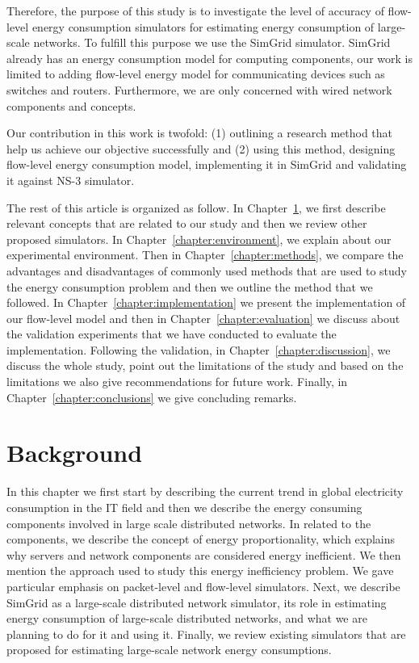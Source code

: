 Therefore, the purpose of this study is to investigate the level of accuracy of flow-level energy consumption simulators for estimating energy consumption of large-scale networks. To fulfill this purpose we use the SimGrid simulator. SimGrid already has an energy consumption model for computing components, our work is limited to adding flow-level energy model for communicating devices such as switches and routers. Furthermore, we are only concerned with wired network components and concepts. 

Our contribution in this work is twofold: (1) outlining a research method that help us achieve our objective successfully and (2) using this method, designing flow-level energy consumption model, implementing it in SimGrid and validating it against NS-3 simulator. 

The rest of this article is organized as follow. In Chapter~\ref{chapter:background}, we first describe relevant concepts that are related to our study and then we review other proposed simulators. In Chapter~\ref{chapter:environment}, we explain about our experimental environment. Then in Chapter~\ref{chapter:methods}, we compare the advantages and disadvantages of commonly used methods that are used to study the energy consumption problem and then we outline the method that we followed. In Chapter~\ref{chapter:implementation} we present the implementation of our flow-level model and then in Chapter~\ref{chapter:evaluation} we discuss about the validation experiments that we have conducted to evaluate the implementation. Following the validation, in Chapter~\ref{chapter:discussion}, we discuss the whole study, point out the limitations of the study and based on the limitations we also give recommendations for future work. Finally, in Chapter~\ref{chapter:conclusions} we give concluding remarks.

\section{Background}
\label{chapter:background} 
In this chapter we first start by describing the current trend in global electricity consumption in the IT field and then we describe the energy consuming components involved in large scale distributed networks. In related to the components, we describe the concept of energy proportionality, which explains why servers and network components are considered energy inefficient. We then mention the approach used to study this energy inefficiency problem. We gave particular emphasis on packet-level and flow-level simulators. Next, we describe SimGrid as a large-scale distributed network simulator, its role in estimating energy consumption of large-scale distributed networks, and what we are planning to do for it and using it. Finally, we review existing simulators that are proposed for estimating large-scale network energy consumptions.
